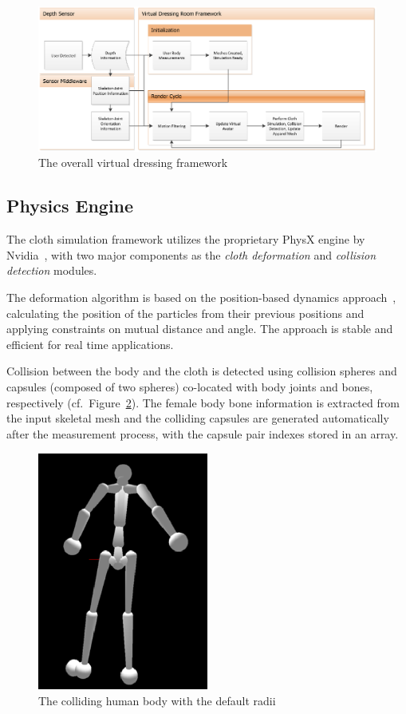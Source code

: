 \documentclass[number,preprint,review,12pt]{elsarticle}
\begin{document}
\begin{figure}[htbp]
	\centerline{
	\includegraphics[width=1.0\textwidth]{./figures/overall.eps}
	}
	\caption{The overall virtual dressing framework}
	\label{fig:overall}
\end{figure}

\subsection{Physics Engine}
\label{subsec:Physics}
The cloth simulation framework utilizes the proprietary PhysX engine by Nvidia~\cite{Kim2011}, with two major components as the {\em cloth deformation} and {\em collision detection} modules. 

The deformation algorithm is based on the position-based dynamics approach~\cite{Mullera2007}, calculating the position of the particles from their previous positions and applying constraints on mutual distance and angle. The approach is stable and efficient for real time applications. 

Collision between the body and the cloth is detected using collision spheres and capsules (composed of two spheres) co-located with body joints and bones, respectively (cf.~Figure~\ref{fig:colliders}). The female body bone information is extracted from the input skeletal mesh and the colliding capsules are generated automatically after the measurement process, with the capsule pair indexes stored in an array.

\begin{figure}[htbp]
	\begin{center}
	\includegraphics[width=0.5\textwidth]{./figures/colliders.eps}
	\end{center}
	\caption{The colliding human body with the default radii}
	\label{fig:colliders}
\end{figure}
\end{document}
